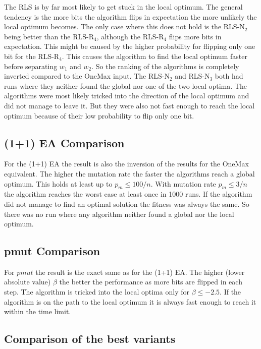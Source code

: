 

The RLS is by far most likely to get stuck in the local optimum.
The general tendency is the more bits the algorithm flips in expectation the more unlikely the local optimum becomes.
The only case where this does not hold is the RLS-N$_2$ being better than the RLS-R$_4$, although the RLS-R$_4$ flips more bits in expectation.
This might be caused by the higher probability for flipping only one bit for the RLS-R$_4$.
This causes the algorithm to find the local optimum faster before separating $w_1$ and $w_2$.
So the ranking of the algorithms is completely inverted compared to the OneMax input.
The RLS-N$_2$ and RLS-N$_3$ both had runs where they neither found the global nor one of the two local optima.
The algorithms were most likely tricked into the direction of the local optimum and did not manage to leave it.
But they were also not fast enough to reach the local optimum because of their low probability to flip only one bit.
\subsection{(1+1) EA Comparison}




For the (1+1) EA the result is also the inversion of the results for the OneMax equivalent.
The higher the mutation rate the faster the algorithms reach a global optimum.
This holds at least up to $p_m\le100/n$.
With mutation rate $p_m\le3/n$ the algorithm reaches the worst case at least once in 1000 runs.
If the algorithm did not manage to find an optimal solution the fitness was always the same.
So there was no run where any algorithm neither found a global nor the local optimum.
\subsection{pmut Comparison}




For $pmut$ the result is the exact same as for the (1+1) EA.
The higher (lower absolute value) $\beta$ the better the performance as more bits are flipped in each step.
The algorithm is tricked into the local optima only for $\beta\le-2.5$.
If the algorithm is on the path to the local optimum it is always fast enough to reach it within the time limit.
\subsection{Comparison of the best variants}


